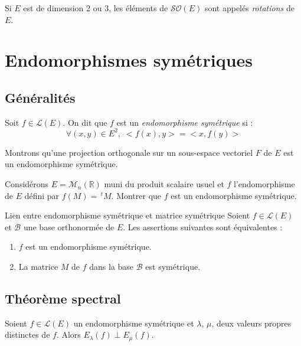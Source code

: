 \documentclass[french,11pt,twoside]{VcCours}
\begin{document}
\begin{Definition}{} Si $E$ est de dimension $2$ ou $3$, les éléments de $\mathcal{SO}(E)$ sont appelés \emph{rotations} de $E$.
\end{Definition}


\section{Endomorphismes symétriques}
\subsection{Généralités}
\begin{Definition}{}
Soit $f \in \mathcal{L}(E)$. On dit que $f$ est un \emph{endomorphisme symétrique} si : 
$$ \forall (x,y) \in E^2, \; <f(x),y>=<x,f(y)>$$
\end{Definition}

\begin{Exemple}{} Montrons qu'une projection orthogonale sur un sous-espace vectoriel $F$ de $E$ est un endomorphisme symétrique.

\vspace*{5cm}
\end{Exemple}

\begin{ApplicationDirecte}{} Considérons $E=\mathcal{M}_n(\mathbb{R})$ muni du produit scalaire usuel et $f$ l'endomorphisme de $E$ défini par $f(M) = \, ^t M$. Montrer que $f$ est un endomorphisme symétrique.
\end{ApplicationDirecte}

\begin{Proposition}{Lien entre endomorphisme symétrique et matrice symétrique}
Soient $f \in \mathcal{L}(E)$ et $\mathcal{B}$ une base orthonormée de $E$. Les assertions suivantes sont équivalentes :
\begin{enumerate}
\item $f$ est un endomorphisme symétrique.
\item La matrice $M$ de $f$ dans la base $\mathcal{B}$ est symétrique.
\end{enumerate}
\end{Proposition}

\begin{Demonstration}{}
\vspace*{7cm}
\end{Demonstration}

\subsection{Théorème spectral}
\begin{Proposition}{} Soient $f \in \mathcal{L}(E)$ un endomorphisme symétrique et $\lambda$, $\mu$, deux valeurs propres distinctes de $f$. Alors $E_{\lambda}(f) \perp E_{\mu}(f)$.
\end{Proposition}
\end{document}
